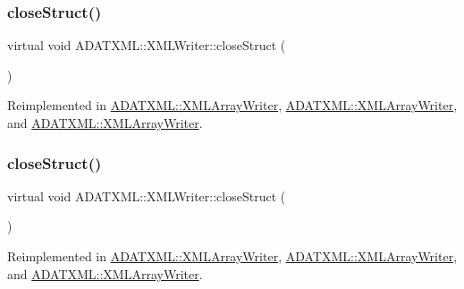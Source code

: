 \subsubsection{\texorpdfstring{closeStruct()}{closeStruct()}\hspace{0.1cm}{\footnotesize\ttfamily [2/3]}}
{\footnotesize\ttfamily virtual void A\+D\+A\+T\+X\+M\+L\+::\+X\+M\+L\+Writer\+::close\+Struct (\begin{DoxyParamCaption}{ }\end{DoxyParamCaption})\hspace{0.3cm}{\ttfamily [virtual]}}



Reimplemented in \mbox{\hyperlink{classADATXML_1_1XMLArrayWriter_a5a849f8851bce99654c44dc08b1fe486}{A\+D\+A\+T\+X\+M\+L\+::\+X\+M\+L\+Array\+Writer}}, \mbox{\hyperlink{classADATXML_1_1XMLArrayWriter_a5a849f8851bce99654c44dc08b1fe486}{A\+D\+A\+T\+X\+M\+L\+::\+X\+M\+L\+Array\+Writer}}, and \mbox{\hyperlink{classADATXML_1_1XMLArrayWriter_a5a849f8851bce99654c44dc08b1fe486}{A\+D\+A\+T\+X\+M\+L\+::\+X\+M\+L\+Array\+Writer}}.

\mbox{\label{classADATXML_1_1XMLWriter_abef3ef70df40a5e9e71c99c56f133589}} 
\subsubsection{\texorpdfstring{closeStruct()}{closeStruct()}\hspace{0.1cm}{\footnotesize\ttfamily [3/3]}}
{\footnotesize\ttfamily virtual void A\+D\+A\+T\+X\+M\+L\+::\+X\+M\+L\+Writer\+::close\+Struct (\begin{DoxyParamCaption}{ }\end{DoxyParamCaption})\hspace{0.3cm}{\ttfamily [virtual]}}



Reimplemented in \mbox{\hyperlink{classADATXML_1_1XMLArrayWriter_a5a849f8851bce99654c44dc08b1fe486}{A\+D\+A\+T\+X\+M\+L\+::\+X\+M\+L\+Array\+Writer}}, \mbox{\hyperlink{classADATXML_1_1XMLArrayWriter_a5a849f8851bce99654c44dc08b1fe486}{A\+D\+A\+T\+X\+M\+L\+::\+X\+M\+L\+Array\+Writer}}, and \mbox{\hyperlink{classADATXML_1_1XMLArrayWriter_a5a849f8851bce99654c44dc08b1fe486}{A\+D\+A\+T\+X\+M\+L\+::\+X\+M\+L\+Array\+Writer}}.


